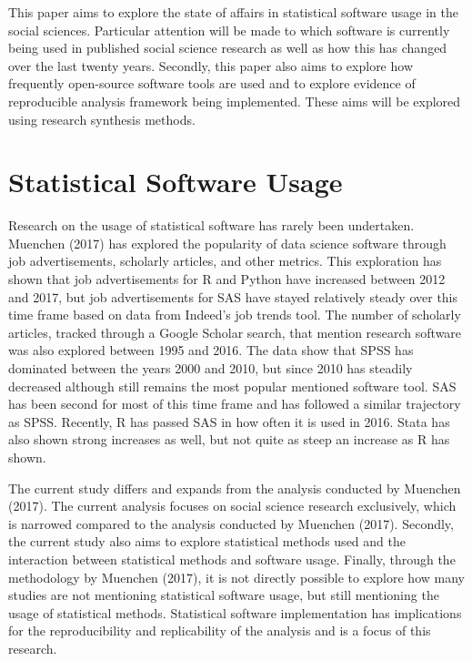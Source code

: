 \documentclass[english,,man]{apa6}
\begin{document}
This paper aims to explore the state of affairs in statistical software usage in the social sciences. Particular attention will be made to which software is currently being used in published social science research as well as how this has changed over the last twenty years. Secondly, this paper also aims to explore how frequently open-source software tools are used and to explore evidence of reproducible analysis framework being implemented. These aims will be explored using research synthesis methods.

\hypertarget{statistical-software-usage}{%
\section{Statistical Software Usage}\label{statistical-software-usage}}

Research on the usage of statistical software has rarely been undertaken. Muenchen (2017) has explored the popularity of data science software through job advertisements, scholarly articles, and other metrics. This exploration has shown that job advertisements for R and Python have increased between 2012 and 2017, but job advertisements for SAS have stayed relatively steady over this time frame based on data from Indeed's job trends tool. The number of scholarly articles, tracked through a Google Scholar search, that mention research software was also explored between 1995 and 2016. The data show that SPSS has dominated between the years 2000 and 2010, but since 2010 has steadily decreased although still remains the most popular mentioned software tool. SAS has been second for most of this time frame and has followed a similar trajectory as SPSS. Recently, R has passed SAS in how often it is used in 2016. Stata has also shown strong increases as well, but not quite as steep an increase as R has shown.

The current study differs and expands from the analysis conducted by Muenchen (2017). The current analysis focuses on social science research exclusively, which is narrowed compared to the analysis conducted by Muenchen (2017). Secondly, the current study also aims to explore statistical methods used and the interaction between statistical methods and software usage. Finally, through the methodology by Muenchen (2017), it is not directly possible to explore how many studies are not mentioning statistical software usage, but still mentioning the usage of statistical methods. Statistical software implementation has implications for the reproducibility and replicability of the analysis and is a focus of this research.
\end{document}
